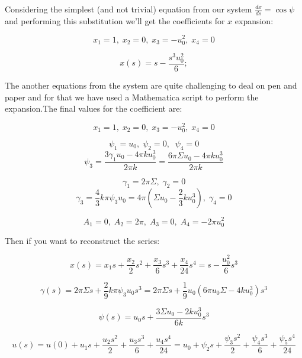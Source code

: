 \documentclass[12pt]{article}
\begin{document}



Considering the simplest (and not trivial) equation from our system $\frac{dx}{ds} =  \cos \psi$ and performing this substitution we'll get the coefficients for $x$ expansion:

$$
x_1 = 1 ,\; x_2 = 0 ,\; x_3 = - u_0^2 ,\; x_4 = 0
$$

$$
x(s)=s-\frac{s^3 u_0^2}{6};
$$

The another equations from the system are quite challenging to deal on pen and paper and for that we have used a Mathematica script to perform the expansion.The final values for the coefficient are:

$$
x_1 = 1 ,\; x_2 = 0 ,\; x_3 = - u_0^2 ,\; x_4 = 0
$$


$$
\psi_1 = u_0  ,\; \psi_2 = 0 ,\; \; \psi_4 = 0
$$
$$
\psi_3 = \frac{3\gamma_1 u_0 - 4 \pi k u_0^3}{2 \pi k } = \frac{6 \pi \Sigma u_0 - 4 \pi k u_0^3}{2 \pi k }
$$


$$
\gamma_1 = 2 \pi \Sigma ,\; \gamma_2 = 0 
$$
$$
\gamma_3 = \frac{4}{3} k \pi \psi_3 u_0 = 4 \pi (\Sigma u_0 - \frac{2}{3} k u_0^3) ,\; \gamma_4 = 0
$$


$$
A_1 = 0 ,\; A_2 =  2 \pi ,\; A_3 = 0 ,\; A_4 = - 2 \pi u_0^2
$$



Then if you want to reconstruct the series:


$$
x(s)=x_1 s+\frac{x_2}{2}s^2+\frac{x_3}{6}s^3+\frac{x_4}{24} s^4 =s-\frac{u_0^2}{6}s^3 
$$





$$
\gamma(s) = 2 \pi \Sigma s + \frac{2}{9} k \pi \psi_3 u_0 s^3 = 2 \pi \Sigma s + \frac{1}{9}  u_0 (6 \pi u_0 \Sigma - 4 k u_0^3)s^3
$$

$$
\psi(s)=u_0s + \frac{3  \Sigma u_0 - 2  k u_0^3}{6 k }s^3
$$

$$
u(s)=u(0) + u_1s + \frac{u_2 s^2}{2} + \frac{u_3 s^3}{6} + \frac{u_4 s^4}{24} = u_0 + \psi_2 s + \frac{\psi_3 s^2}{2} + \frac{\psi_4 s^3}{6} + \frac{\psi_5 s^4}{24}
$$
\end{document}
